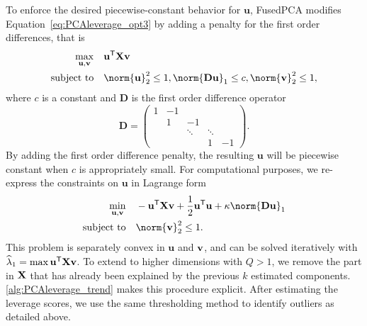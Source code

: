 \documentclass{article}
\newcommand{\pcatf}{FusedPCA\xspace}
\renewcommand{\hat}{\widehat}
\newcommand{\X}{\bfX}
\renewcommand{\top}{\mathsf{T}}
\begin{document}
To enforce the desired piecewise-constant behavior for $\mathbf{u}$, \pcatf modifies Equation~\eqref{eq:PCAleverage_opt3} by adding
a penalty for the first order differences, that is
\begin{align}
\label{eq:our_opt}
\begin{split} \max_{\mathbf{u}, \mathbf{v}} & \quad \mathbf{u}^\top \X
\mathbf{v} \\ \text{subject to} & \quad \norm{\mathbf{u}}^2_2 \le 1, \norm{\mathbf{D}
\mathbf{u}}_1 \le c, \norm{\mathbf{v}}^2_2 \le 1,
\end{split}
\end{align} where $c$ is a constant and $\mathbf{D}$ is the first order difference
operator
\begin{equation}\mathbf{ D} =
\begin{pmatrix} 1 & -1 & & &\\ & 1 & -1 & & \\ & & \ddots & \ddots & \\ & & & 1
& -1
\end{pmatrix}.
\end{equation} By adding the first order difference penalty, the resulting
$\mathbf{u}$ will be piecewise constant when $c$ is appropriately small. For computational purposes, we re-express the constraints on $\mathbf{u}$ in
Lagrange form 
\begin{align}
\label{eq:our_opt2}
\begin{split} \min_{\mathbf{u}, \mathbf{v}} & \quad - \mathbf{u}^\top \X
\mathbf{v} + \frac{1}{2} \mathbf{u}^\top \mathbf{u} + \kappa\norm{\mathbf{D}
\mathbf{u}}_1 \\ \text{subject to} & \quad \norm{\mathbf{v}}^2_2 \le 1.
\end{split}
\end{align} 
This problem is separately convex in $\mathbf{u}$ and $\mathbf v$, and can be solved iteratively with $\hat\lambda_1 = \max\mathbf{u}^\top\X\bfv$.
To extend to higher dimensions with $Q > 1$, we 
remove the part in $\X$ that has already been explained by the previous $k$
estimated components. 
\autoref{alg:PCAleverage_trend} makes this procedure explicit.
After estimating the leverage scores, 
we use the same thresholding method to identify outliers as detailed above.
\end{document}
